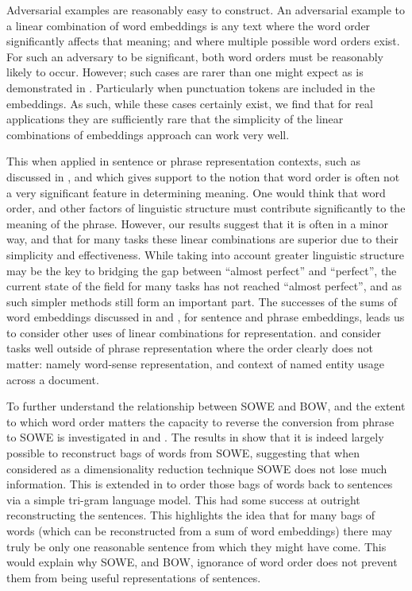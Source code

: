 \documentclass{book}
\begin{document}
Adversarial examples are reasonably easy to construct.
An adversarial example to a linear combination of word embeddings is any text where the word order significantly affects that meaning;
and where multiple possible word orders exist.
For such an adversary to be significant, both word orders must be reasonably likely to occur.
However; such cases are rarer than one might expect  as is demonstrated in .
Particularly when punctuation tokens are included in the embeddings.
As such, while these cases certainly exist, we find that for real applications
they are sufficiently rare that the simplicity of the linear combinations of embeddings approach can work very well.


This when applied in sentence or phrase representation contexts,
such as discussed in , and 
which gives support to the notion that word order is often not a very significant feature in determining meaning.
One would think that word order, and other factors of linguistic structure must contribute significantly to the meaning of the phrase.
However, our results suggest that it is often in a minor way, and that for many tasks these linear combinations are superior due to their simplicity and effectiveness.
While taking into account greater linguistic structure may be the key to bridging the gap between ``almost perfect'' and ``perfect'', the current state of the field for many tasks has not reached ``almost perfect'', and as such simpler methods still form an important part.
The successes of the sums of word embeddings discussed in  and , for sentence and phrase embeddings, leads us to consider other uses of linear combinations for representation.
 and  consider tasks well outside of phrase representation where the order clearly does not matter: namely word-sense representation, and context of named entity usage across a document.

To further understand the relationship between SOWE and BOW, and the extent to which word order matters the capacity to reverse the conversion from phrase to SOWE is investigated in  and .
The results in  show that it is indeed largely possible to reconstruct bags of words from SOWE, suggesting that when considered as a dimensionality reduction technique SOWE does not lose much information.
This is extended in  to order those bags of words back to sentences via a simple tri-gram language model.
This had some success at outright reconstructing the sentences.
This highlights the idea that for many  bags of words (which can be reconstructed from a sum of word embeddings) there may truly be only one reasonable sentence from which they might have come.
This would explain why SOWE, and BOW, ignorance of word order does not prevent them from being useful representations of sentences.
\end{document}
